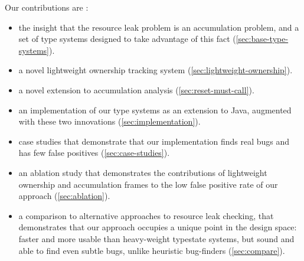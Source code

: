 Our contributions are :
\begin{itemize}
\item the insight that the resource leak problem is an accumulation problem,
  and a set of type systems designed to take advantage of this fact (\cref{sec:base-type-systems}).
\item a novel lightweight ownership tracking system (\cref{sec:lightweight-ownership}).
\item a novel extension to accumulation analysis (\cref{sec:reset-must-call}).
\item an implementation of our type systems as an extension to Java,
  augmented with these two innovations (\cref{sec:implementation}).
\item case studies that demonstrate that our implementation finds real
  bugs and has few false positives (\cref{sec:case-studies}).
\item an ablation study that demonstrates the contributions of
  lightweight ownership and accumulation frames to the low false
  positive rate of our approach (\cref{sec:ablation}).
\item a comparison to alternative approaches to resource leak
  checking, that demonstrates that our approach occupies a unique
  point in the design space: faster and more usable than heavy-weight
  typestate systems, but sound and able to find even subtle bugs,
  unlike heuristic bug-finders (\cref{sec:compare}).
\end{itemize}
  
